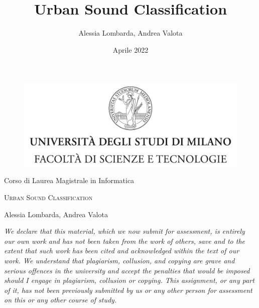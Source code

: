 \documentclass[oneside,openany]{article}
\title{Urban Sound Classification}
\author{Alessia Lombarda, Andrea Valota}
\date{Aprile 2022}
\begin{document}
    \begin{titlepage}
	
	    \begin{figure}
	        \centering
	    	\includegraphics[width=\textwidth]{MINERVA.jpg}
	    	\vspace{0.5 cm}
	    \end{figure}
	

    \begin{center}
    {\Large Corso di Laurea Magistrale in Informatica}
    \end{center}

    \begin{center}
    \vspace{1 cm}
    {\huge \textsc{ Urban Sound Classification } }
    \end{center}
    \begin{center}
    \vspace{1 cm}
    {\LARGE Alessia Lombarda, Andrea Valota}
    \end{center}
    
    \par
        \vspace{1 cm}
    \vfill
    \end{titlepage}
    
    \frontmatter
    
    \tableofcontents
    \vfill
    \textit{We declare that this material, which we now submit for assessment, is entirely our own work and has not been taken from the work of others, save and to the extent that such work has been cited and acknowledged within the text of our work. We understand that plagiarism, collusion, and copying are grave and serious offences in the university and accept the penalties that would be imposed should I engage in plagiarism, collusion or copying. This assignment, or any part of it, has not been previously submitted by us or any other person for assessment on this or any other course of study.}
    \newpage
    \pagestyle{plain}
    \mainmatter
    
\end{document}

